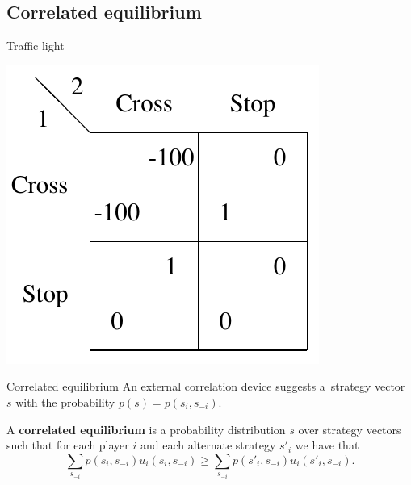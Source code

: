 \documentclass{beamer}
\begin{document}

\subsection{Correlated equilibrium}

\begin{frame}{Traffic light}
  \begin{center}
    \includegraphics[width=\textwidth,height=0.8\textheight,keepaspectratio]{img/traffic-light.png}
  \end{center}
\end{frame}

\begin{frame}{Correlated equilibrium}
  An external correlation device suggests a~strategy vector $s$ with the
  probability $p(s) = p(s_i, s_{-i})$.
  \pause

  A {\bf correlated equilibrium} is a probability distribution $s$ over
  strategy vectors such that for each player $i$ and each alternate strategy
  $s'_i$ we have that
  \[\sum_{s_{-i}} p(s_i , s_{-i}) u_i(s_i , s_{-i}) \ge \sum_{s_{-i}} p(s'_i ,
    s_{-i}) u_i(s'_i , s_{-i}).\]
\end{frame}
\end{document}
